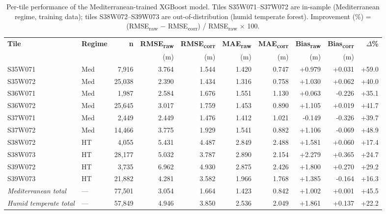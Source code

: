 \begin{table}[t]
\centering
\caption{Per-tile performance of the Mediterranean-trained XGBoost model. Tiles S35W071--S37W072 are in-sample (Mediterranean regime, training data); tiles S38W072--S39W073 are out-of-distribution (humid temperate forest). Improvement (\%) = (RMSE\textsubscript{raw} $-$ RMSE\textsubscript{corr}) / RMSE\textsubscript{raw} $\times$ 100.}
\label{tab:per_tile}
\footnotesize
\begin{tabular}{llrrrrrrrr}
\toprule
\textbf{Tile} & \textbf{Regime} & \textbf{n} &
\textbf{RMSE\textsubscript{raw}} & \textbf{RMSE\textsubscript{corr}} &
\textbf{MAE\textsubscript{raw}} & \textbf{MAE\textsubscript{corr}} &
\textbf{Bias\textsubscript{raw}} & \textbf{Bias\textsubscript{corr}} &
\textbf{$\Delta$\%} \\
& & & (m) & (m) & (m) & (m) & (m) & (m) & \\
\midrule
S35W071 & Med & 7,916 & 3.764 & 1.544 & 1.420 & 0.747 & +0.979 & +0.031 & +59.0 \\
S35W072 & Med & 25,038 & 2.390 & 1.434 & 1.316 & 0.758 & +1.030 & +0.062 & +40.0 \\
S36W071 & Med & 1,987 & 2.584 & 1.676 & 1.551 & 1.130 & +0.063 & -0.226 & +35.1 \\
S36W072 & Med & 25,645 & 3.017 & 1.759 & 1.453 & 0.890 & +1.105 & +0.019 & +41.7 \\
S37W071 & Med & 2,449 & 2.449 & 1.476 & 1.412 & 1.021 & -0.149 & -0.326 & +39.7 \\
S37W072 & Med & 14,466 & 3.775 & 1.929 & 1.541 & 0.882 & +1.106 & -0.069 & +48.9 \\
S38W072 & HT & 4,055 & 5.431 & 4.487 & 2.849 & 2.488 & +1.581 & +0.060 & +17.4 \\
S38W073 & HT & 28,177 & 5.032 & 3.787 & 2.890 & 2.154 & +2.279 & +0.365 & +24.7 \\
S39W072 & HT & 3,735 & 6.962 & 4.930 & 2.875 & 2.426 & +1.800 & +0.270 & +29.2 \\
S39W073 & HT & 21,882 & 4.281 & 3.582 & 1.966 & 1.768 & +1.385 & -0.164 & +16.3 \\
\midrule
\textit{Mediterranean total} & --- & 77,501 & 3.054 & 1.664 & 1.423 & 0.842 & +1.002 & +0.001 & +45.5 \\
\textit{Humid temperate total} & --- & 57,849 & 4.946 & 3.850 & 2.536 & 2.049 & +1.861 & +0.137 & +22.2 \\
\bottomrule
\end{tabular}
\end{table}
